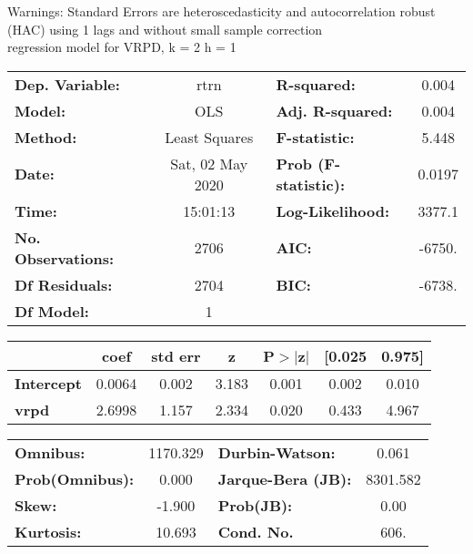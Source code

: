 Warnings: \newline
 [1] Standard Errors are heteroscedasticity and autocorrelation robust (HAC) using 1 lags and without small sample correction\\ 

regression model for VRPD, k = 2 h = 1\begin{center}
\begin{tabular}{lclc}
\toprule
\textbf{Dep. Variable:}    &       rtrn       & \textbf{  R-squared:         } &     0.004   \\
\textbf{Model:}            &       OLS        & \textbf{  Adj. R-squared:    } &     0.004   \\
\textbf{Method:}           &  Least Squares   & \textbf{  F-statistic:       } &     5.448   \\
\textbf{Date:}             & Sat, 02 May 2020 & \textbf{  Prob (F-statistic):} &   0.0197    \\
\textbf{Time:}             &     15:01:13     & \textbf{  Log-Likelihood:    } &    3377.1   \\
\textbf{No. Observations:} &        2706      & \textbf{  AIC:               } &    -6750.   \\
\textbf{Df Residuals:}     &        2704      & \textbf{  BIC:               } &    -6738.   \\
\textbf{Df Model:}         &           1      & \textbf{                     } &             \\
\bottomrule
\end{tabular}
\begin{tabular}{lcccccc}
                   & \textbf{coef} & \textbf{std err} & \textbf{z} & \textbf{P$> |$z$|$} & \textbf{[0.025} & \textbf{0.975]}  \\
\midrule
\textbf{Intercept} &       0.0064  &        0.002     &     3.183  &         0.001        &        0.002    &        0.010     \\
\textbf{vrpd}      &       2.6998  &        1.157     &     2.334  &         0.020        &        0.433    &        4.967     \\
\bottomrule
\end{tabular}
\begin{tabular}{lclc}
\textbf{Omnibus:}       & 1170.329 & \textbf{  Durbin-Watson:     } &    0.061  \\
\textbf{Prob(Omnibus):} &   0.000  & \textbf{  Jarque-Bera (JB):  } & 8301.582  \\
\textbf{Skew:}          &  -1.900  & \textbf{  Prob(JB):          } &     0.00  \\
\textbf{Kurtosis:}      &  10.693  & \textbf{  Cond. No.          } &     606.  \\
\bottomrule
\end{tabular}
\end{center}

